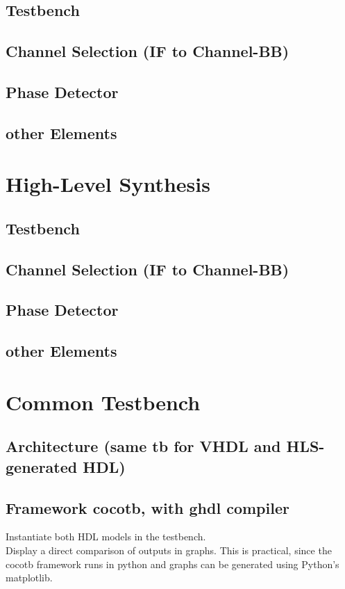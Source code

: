   \subsection{Testbench}
  \subsection{Channel Selection (IF to Channel-BB)}
  \subsection{Phase Detector}
  \subsection{other Elements}

  \section{High-Level Synthesis}
  \subsection{Testbench}
  \subsection{Channel Selection (IF to Channel-BB)}
  \subsection{Phase Detector}
  \subsection{other Elements}

\section{Common Testbench}
  \subsection{Architecture (same tb for VHDL and HLS-generated HDL)}
  \subsection{Framework cocotb, with ghdl compiler}
  Instantiate both HDL models in the testbench.\\
  Display a direct comparison of outputs in graphs. This is practical, since the cocotb framework runs in python and graphs can be generated using Python's matplotlib.

